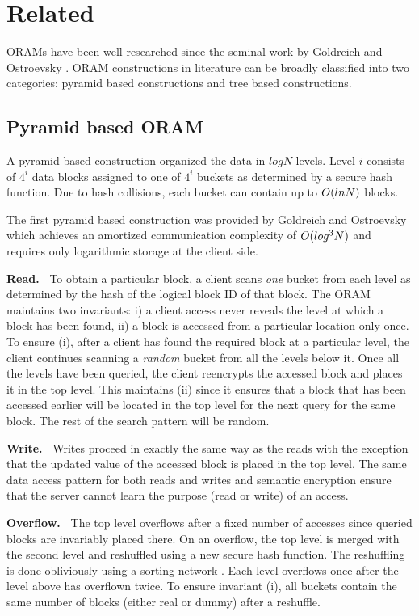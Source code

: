 \section{Related}
\label{oram:related}

ORAMs have been well-researched since the seminal work by Goldreich and Ostroevsky \cite{goldreich}. 
ORAM constructions in literature can be 
broadly classified into two categories: pyramid based constructions and tree based constructions. 


\subsection{Pyramid based ORAM}
\label{oram:related:pyramid}
%
A pyramid based construction organized the data in $logN$ levels. 
Level $i$ consists of $4^{i}$ data blocks assigned to one of $4^{i}$ buckets as determined by a secure 
hash function. Due to hash collisions, each bucket can contain up to $O(ln N)$ blocks.

The first pyramid based construction was provided by Goldreich and 
Ostroevsky \cite{goldreich} which achieves an amortized communication complexity of $O(log^{3}N)$ and 
requires only logarithmic storage at the client 
side. 

{\bf Read.~}
%
To obtain a particular block, a client scans {\em one} bucket from each level as determined by 
the hash of the logical block ID of that block. The ORAM maintains two invariants: i) a client 
access never reveals the level at which a block has been found, ii) a block is accessed 
from a particular location only once. To ensure (i), after a client has found the required block 
at a particular level, the client continues scanning a {\em random} bucket from all the levels 
below it. Once all the levels have been queried, the client reencrypts the accessed block and places 
it in the top level. This maintains (ii) since it ensures that a block that has been accessed earlier 
will be located in the top level for the next query for the same block. The rest of the search pattern will 
be random. 

{\bf Write.~} 
%
Writes proceed in exactly the same way as the reads with the exception that the updated value of the accessed block 
is placed in the top level. The same data access pattern for both reads and writes and semantic encryption ensure that 
the server cannot learn the purpose (read or write) of an access.

{\bf Overflow.~}
%
The top level overflows after a fixed number of accesses since queried blocks are invariably placed there. On an overflow, the top level 
is merged with the second level and reshuffled using a new secure hash function. The reshuffling is done obliviously using a sorting 
network \cite{goldreich,bforam,randomizedshellsort}. Each level overflows once after the level above has overflown twice. To ensure invariant 
(i), all buckets contain the same number of blocks (either real or dummy) after a reshuffle.


